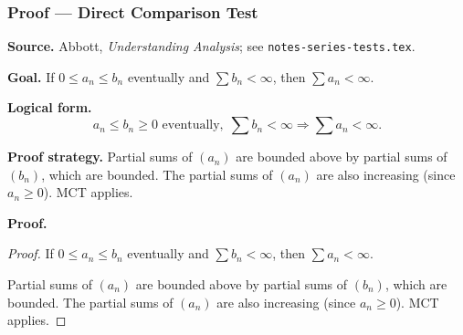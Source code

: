 
\clearpage
{}
\hypertarget{proof-RA-ABB-T-direct-comparison}{}

\subsubsection[Direct Comparison Test]{Proof --- Direct Comparison Test}

\bigskip

\noindent
\textbf{Source.}
Abbott, \emph{Understanding Analysis}; see \texttt{notes-series-tests.tex}.

\vspace{0.75em}

\noindent
\textbf{Goal.}
If $0 \le a_n \le b_n$ eventually and $\sum b_n < \infty$, then $\sum a_n < \infty$.

\vspace{0.75em}

\noindent
\textbf{Logical form.}
\[
  a_n \le b_n \ge 0 \text{ eventually},\; \sum b_n < \infty \Rightarrow \sum a_n < \infty.
\]

\vspace{0.75em}

\noindent
\textbf{Proof strategy.}
Partial sums of $(a_n)$ are bounded above by partial sums of $(b_n)$, which are bounded. The partial sums of $(a_n)$ are also increasing (since $a_n \ge 0$). MCT applies.

\vspace{0.75em}

\noindent
\textbf{Proof.}
\begin{proof}
\Claim If $0 \le a_n \le b_n$ eventually and $\sum b_n < \infty$, then $\sum a_n < \infty$.

\Given 

\Goal 

\Strategy Partial sums of $(a_n)$ are bounded above by partial sums of $(b_n)$, which are bounded. The partial sums of $(a_n)$ are also increasing (since $a_n \ge 0$). MCT applies.

\medskip


\end{proof}

